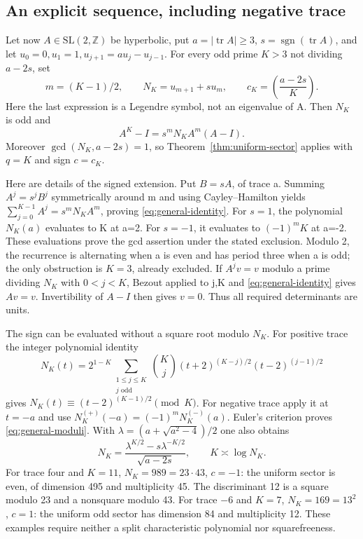\subsection{An explicit sequence, including negative trace}
Let now $A\in\mathrm{SL}(2,\mathbb Z)$ be hyperbolic, put
$a=|\operatorname{tr}A|\geq3$, $s=\operatorname{sgn}(\operatorname{tr}A)$,
and let $u_0=0,u_1=1,u_{j+1}=a u_j-u_{j-1}$. For every odd prime $K>3$
not dividing $a-2s$, set
\begin{equation}\label{eq:general-moduli}
 m=(K-1)/2,\qquad N_K=u_{m+1}+s u_m,\qquad
 c_K=\left(\frac{a-2s}{K}\right).
\end{equation}
Here the last expression is a Legendre symbol, not an eigenvalue of A.
Then $N_K$ is odd and
\begin{equation}\label{eq:general-identity}
 A^K-I=s^mN_K A^m(A-I).
\end{equation}
Moreover $\gcd(N_K,a-2s)=1$, so Theorem~\ref{thm:uniform-sector} applies
with $q=K$ and sign $c=c_K$.

Here are details of the signed extension. Put $B=sA$, of trace a. Summing
$A^j=s^jB^j$ symmetrically around m and using Cayley--Hamilton yields
$\sum_{j=0}^{K-1}A^j=s^mN_KA^m$, proving
\eqref{eq:general-identity}. For $s=1$, the polynomial $N_K(a)$ evaluates
to K at a=2. For $s=-1$, it evaluates to $(-1)^mK$ at a=-2.
These evaluations prove the gcd assertion under the stated exclusion.
Modulo 2, the recurrence is alternating when a is even and has period three
when a is odd; the only obstruction is $K=3$, already excluded.
If $A^jv=v$ modulo a prime dividing $N_K$ with $0<j<K$, Bezout applied
to j,K and \eqref{eq:general-identity} gives $Av=v$. Invertibility of $A-I$
then gives $v=0$. Thus all required determinants are units.

The sign can be evaluated without a square root modulo $N_K$. For positive
trace the integer polynomial identity
\[
 N_K(t)=2^{1-K}\sum_{\substack{1\leq j\leq K\\j\text{ odd}}}
 \binom Kj(t+2)^{(K-j)/2}(t-2)^{(j-1)/2}
\]
gives $N_K(t)\equiv(t-2)^{(K-1)/2}\pmod K$. For negative trace apply
it at $t=-a$ and use $N_K^{(+)}(-a)=(-1)^mN_K^{(-)}(a)$.
Euler's criterion proves \eqref{eq:general-moduli}. With
$\lambda=(a+\sqrt{a^2-4})/2$ one also obtains
\[
 N_K=\frac{\lambda^{K/2}-s\lambda^{-K/2}}{\sqrt{a-2s}},
 \qquad K\asymp\log N_K.
\]
For trace four and $K=11$, $N_K=989=23\cdot43$, $c=-1$:
the uniform sector is even, of dimension 495 and multiplicity 45.
The discriminant 12 is a square modulo 23 and a nonsquare modulo 43.
For trace $-6$ and $K=7$, $N_K=169=13^2$, $c=1$:
the uniform odd sector has dimension 84 and multiplicity 12. These examples
require neither a split characteristic polynomial nor squarefreeness.

